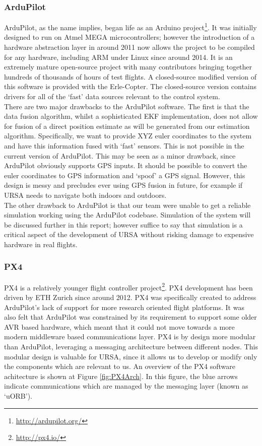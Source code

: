 \documentclass[capstone_report.tex]{subfiles}
\begin{document}
    \subsubsection{ArduPilot}
    ArduPilot, as the name implies, began life as an Arduino project\footnote{\url{http://ardupilot.org/}}. It was initially designed to run on Atmel MEGA microcontrollers; however the introduction of a hardware abstraction layer in around 2011 now allows the project to be compiled for any hardware, including ARM under Linux since around 2014. It is an extremely mature open-source project with many contributors bringing together hundreds of thousands of hours of test flights. A closed-source modified version of this software is provided with the Erle-Copter. The closed-source version contains drivers for all of the `fast' data sources relevant to the control system. \\

    There are two major drawbacks to the ArduPilot software. The first is that the data fusion algorithm, whilst a sophisticated EKF implementation, does not allow for fusion of a direct position estimate as will be generated from our estimation algorithm. Specifically, we want to provide XYZ euler coordinates to the system and have this information fused with `fast' sensors. This is not possible in the current version of ArduPilot. This may be seen as a minor drawback, since ArduPilot obviously supports GPS inputs. It should be possible to convert the euler coordinates to GPS information and `spoof' a GPS signal. However, this design is messy and precludes ever using GPS fusion in future, for example if URSA needs to navigate both indoors and outdoors. \\

    The other drawback to ArduPilot is that our team were unable to get a reliable simulation working using the ArduPilot codebase. Simulation of the system will be discussed further in this report; however suffice to say that simulation is a critical aspect of the development of URSA without risking damage to expensive hardware in real flights.

    \subsubsection{PX4}
    PX4 is a relatively younger flight controller project\footnote{\url{http://px4.io/}}. PX4 development has been driven by ETH Zurich since around 2012. PX4 was specifically created to address ArduPilot's lack of support for more research oriented flight platforms. It was also felt that ArduPilot was constrained by its requirement to support some older AVR based hardware, which meant that it could not move towards a more modern middleware based communications layer. PX4 is by design more modular than ArduPilot, leveraging a messaging architecture between different nodes. This modular design is valuable for URSA, since it allows us to develop or modify only the components which are relevant to us. An overview of the PX4 software achitecture is shown at Figure \ref{fig:PX4Arch}. In this figure, the blue arrows indicate communications which are managed by the messaging layer (known as `uORB').\\
\end{document}
